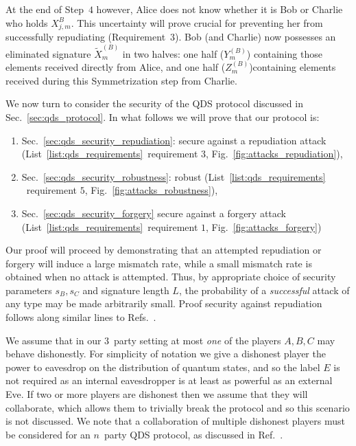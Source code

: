  At the end of Step~$4$ however, Alice does not know whether it is Bob or Charlie who holds $X_{j, m}^B$. This uncertainty will prove crucial for preventing her from successfully repudiating (Requirement~$3$). Bob (and Charlie) now possesses an eliminated signature $\tilde{X}_m^{\left(B\right)}$ in two halves: one half ($Y_m^{\left(B\right)}$) containing those elements received directly from Alice, and one half ($Z_m^{\left(B\right)}$)containing elements received during this Symmetrization step from Charlie.
 \fi


We now turn to consider the security of the QDS protocol discussed in Sec.~\ref{sec:qds_protocol}. %
In what follows we will prove that our protocol is:
\begin{enumerate}
\item Sec.~\ref{sec:qds_security_repudiation}: secure against a repudiation attack (List~\ref{list:qds_requirements}~requirement $3$, Fig.~\ref{fig:attacks_repudiation}), 
\item Sec.~\ref{sec:qds_security_robustness}: robust (List~\ref{list:qds_requirements} ~requirement $5$, Fig.~\ref{fig:attacks_robustness}),
\item Sec.~\ref{sec:qds_security_forgery} secure against a forgery attack (List~\ref{list:qds_requirements}~requirement $1$, Fig.~\ref{fig:attacks_forgery})
\end{enumerate}

Our proof will proceed by demonstrating that an attempted repudiation or forgery will induce a large mismatch rate, while a small mismatch rate is obtained when no attack is attempted. Thus, by appropriate choice of security parameters $s_B, s_C$ and signature length $L$, the probability of a \emph{successful} attack of any type may be made arbitrarily small. Proof security against repudiation follows along similar lines to Refs.~\cite{Dunjko2014, Wallden2015, Donaldson2016, Croal2016, Thornton2019}.

We assume that in our $3$~party setting at most \emph{one} of the players $A, B, C$ may behave dishonestly. For simplicity of notation we give a dishonest player the power to eavesdrop on the distribution of quantum states, and so the label $E$ is not required as an internal eavesdropper is at least as powerful as an external Eve. If two or more players are dishonest then we assume that they will collaborate, which allows them to trivially break the protocol and so this scenario is not discussed. We note that a collaboration of multiple dishonest players must be considered for an $n$~party QDS protocol, as discussed in Ref.~\cite{Arrazola2016}.

